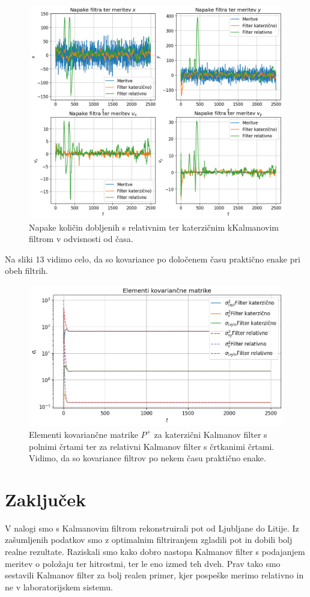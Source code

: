 \documentclass[slovene,11pt,a4paper]{article}
\begin{document}
\begin{figure}[h!]
\centering
\includegraphics[width=14cm]{slika12.png}
\caption{Napake količin dobljenih s relativnim ter katerzičnim kKalmanovim filtrom v odvisnosti od časa.}
\end{figure}

Na sliki 13 vidimo celo, da so kovariance po določenem času praktično enake pri obeh filtrih.

\begin{figure}[h!]
\centering
\includegraphics[width=12cm]{slika13.png}
\caption{Elementi kovariančne matrike $P^+$ za katerzični Kalmanov filter s polnimi črtami ter za relativni Kalmanov filter s črtkanimi črtami. Vidimo, da so kovariance filtrov po nekem času praktično enake.}
\end{figure}

\section{Zaključek}

V nalogi smo s Kalmanovim filtrom rekonstruirali pot od Ljubljane do Litije. Iz zašumljenih podatkov smo z optimalnim filtriranjem zgladili pot in dobili bolj realne rezultate. Raziskali smo kako dobro nastopa Kalmanov filter s podajanjem meritev o položaju ter hitrostmi, ter le eno izmed teh dveh. Prav tako smo sestavili Kalmanov filter za bolj realen primer, kjer pospeške merimo relativno in ne v laboratorijskem sistemu.
\end{document}
